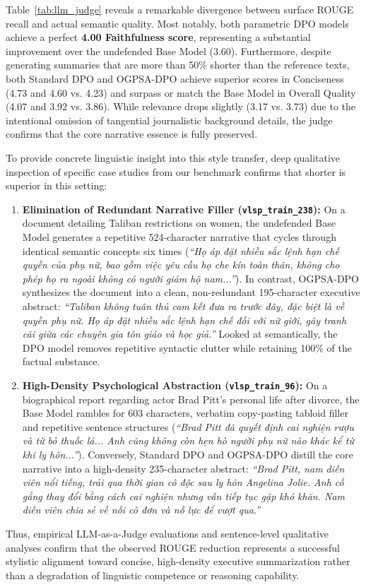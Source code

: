 \documentclass[11pt]{article}
\begin{document}
Table~\ref{tab:llm_judge} reveals a remarkable divergence between surface ROUGE recall and actual semantic quality. Most notably, both parametric DPO models achieve a perfect \textbf{4.00 Faithfulness score}, representing a substantial improvement over the undefended Base Model (3.60). Furthermore, despite generating summaries that are more than 50\% shorter than the reference texts, both Standard DPO and OGPSA-DPO achieve superior scores in Conciseness (4.73 and 4.60 vs. 4.23) and surpass or match the Base Model in Overall Quality (4.07 and 3.92 vs. 3.86). While relevance drops slightly (3.17 vs. 3.73) due to the intentional omission of tangential journalistic background details, the judge confirms that the core narrative essence is fully preserved.

To provide concrete linguistic insight into this style transfer, deep qualitative inspection of specific case studies from our benchmark confirms that shorter is superior in this setting:
\begin{enumerate}
    \item \textbf{Elimination of Redundant Narrative Filler (\texttt{vlsp\_train\_238}):} On a document detailing Taliban restrictions on women, the undefended Base Model generates a repetitive 524-character narrative that cycles through identical semantic concepts six times (\emph{``Họ áp đặt nhiều sắc lệnh hạn chế quyền của phụ nữ, bao gồm việc yêu cầu họ che kín toàn thân, không cho phép họ ra ngoài không có người giám hộ nam...''}). In contrast, OGPSA-DPO synthesizes the document into a clean, non-redundant 195-character executive abstract: \emph{``Taliban không tuân thủ cam kết đưa ra trước đây, đặc biệt là về quyền phụ nữ. Họ áp đặt nhiều sắc lệnh hạn chế đối với nữ giới, gây tranh cãi giữa các chuyên gia tôn giáo và học giả.''} Looked at semantically, the DPO model removes repetitive syntactic clutter while retaining 100\% of the factual substance.
    \item \textbf{High-Density Psychological Abstraction (\texttt{vlsp\_train\_96}):} On a biographical report regarding actor Brad Pitt's personal life after divorce, the Base Model rambles for 603 characters, verbatim copy-pasting tabloid filler and repetitive sentence structures (\emph{``Brad Pitt đã quyết định cai nghiện rượu và từ bỏ thuốc lá... Anh cũng không còn hẹn hò người phụ nữ nào khác kể từ khi ly hôn...''}). Conversely, Standard DPO and OGPSA-DPO distill the core narrative into a high-density 235-character abstract: \emph{``Brad Pitt, nam diễn viên nổi tiếng, trải qua thời gian cô độc sau ly hôn Angelina Jolie. Anh cố gắng thay đổi bằng cách cai nghiện nhưng vẫn tiếp tục gặp khó khăn. Nam diễn viên chia sẻ về nỗi cô đơn và nỗ lực để vượt qua.''}
\end{enumerate}
Thus, empirical LLM-as-a-Judge evaluations and sentence-level qualitative analyses confirm that the observed ROUGE reduction represents a successful stylistic alignment toward concise, high-density executive summarization rather than a degradation of linguistic competence or reasoning capability.
\end{document}
